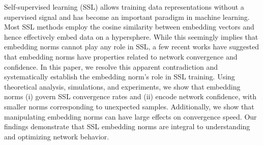 Self-supervised learning (SSL) allows training data representations without a supervised signal and has become an important paradigm in machine learning. Most SSL methods employ the cosine similarity between embedding vectors and hence effectively embed data on a hypersphere. While this seemingly implies that embedding norms cannot play any role in SSL, a few recent works have suggested that embedding norms have properties related to network convergence and confidence. In this paper, we resolve this apparent contradiction and systematically establish the embedding norm's role in SSL training. Using theoretical analysis, simulations, and experiments, we show that embedding norms (i) govern SSL convergence rates and (ii) encode network confidence, with smaller norms corresponding to unexpected samples. 
Additionally, we show that manipulating embedding norms can have large effects on convergence speed.
Our findings demonstrate that SSL embedding norms are integral to understanding and optimizing network behavior.
